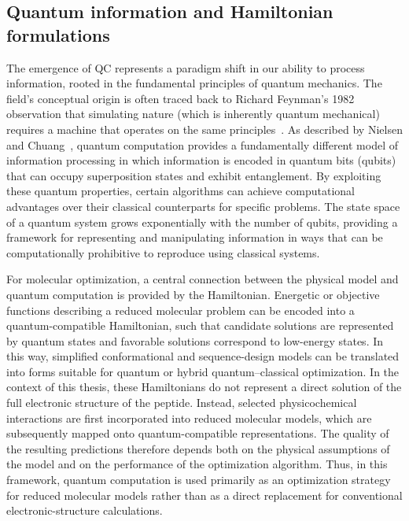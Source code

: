 \subsection{Quantum information and Hamiltonian formulations}

The emergence of QC represents a paradigm shift in our ability to process information, rooted in the fundamental principles of quantum mechanics. The field's conceptual origin is often traced back to Richard Feynman's 1982 observation that simulating nature (which is inherently quantum mechanical) requires a machine that operates on the same principles~\cite{feynman1982simulating}. As described by Nielsen and Chuang~\cite{nielsen2010quantum}, quantum computation provides a fundamentally different model of information processing in which information is encoded in quantum bits (qubits) that can occupy superposition states and exhibit entanglement. By exploiting these quantum properties, certain algorithms can achieve computational advantages over their classical counterparts for specific problems. The state space of a quantum system grows exponentially with the number of qubits, providing a framework for representing and manipulating information in ways that can be computationally prohibitive to reproduce using classical systems.

For molecular optimization, a central connection between the physical model and quantum computation is provided by the Hamiltonian. Energetic or objective functions describing a reduced molecular problem can be encoded into a quantum-compatible Hamiltonian, such that candidate solutions are represented by quantum states and favorable solutions correspond to low-energy states. In this way, simplified conformational and sequence-design models can be translated into forms suitable for quantum or hybrid quantum--classical optimization.
In the context of this thesis, these Hamiltonians do not represent a direct solution of the full electronic structure of the peptide. Instead, selected physicochemical interactions are first incorporated into reduced molecular models, which are subsequently mapped onto quantum-compatible representations. The quality of the resulting predictions therefore depends both on the physical assumptions of the model and on the performance of the optimization algorithm. Thus, in this framework, quantum computation is used primarily as an optimization strategy for reduced molecular models rather than as a direct replacement for conventional electronic-structure calculations.

